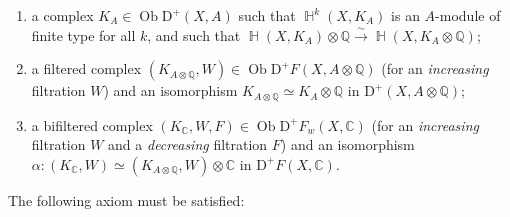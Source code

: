     
 \begin{enumerate}
      
 \item[(𝛼)]
        a complex \(K_A\in \operatorname {Ob}\mathrm {D}^+(X,A)\) such that \(\operatorname {\mathbb {H}}^k(X,K_A)\) is an \(A\)-module of finite type for all \(k\), and such that \(\operatorname {\mathbb {H}}(X,K_A)\otimes \mathbb {Q}\xrightarrow {\sim }\operatorname {\mathbb {H}}(X,K_A\otimes \mathbb {Q})\);
      


      
 \item[(𝛽)]
        a filtered complex \((K_{A\otimes \mathbb {Q}},W)\in \operatorname {Ob}\mathrm {D}^+F(X,A\otimes \mathbb {Q})\) (for an \emph{increasing} filtration \(W\)) and an isomorphism \(K_{A\otimes \mathbb {Q}}\simeq  K_A\otimes \mathbb {Q}\) in \(\mathrm {D}^+(X,A\otimes \mathbb {Q})\);
      


      
 \item[(𝛾)]
        a bifiltered complex \((K_\mathbb {C},W,F)\in \operatorname {Ob}\mathrm {D}^+F_w(X,\mathbb {C})\) (for an \emph{increasing} filtration \(W\) and a \emph{decreasing} filtration \(F\)) and an isomorphism \(\alpha \colon (K_\mathbb {C},W)\simeq (K_{A\otimes \mathbb {Q}},W)\otimes \mathbb {C}\) in \(\mathrm {D}^+F(X,\mathbb {C})\).
      

    \end{enumerate}\par{}The following axiom must be satisfied:

